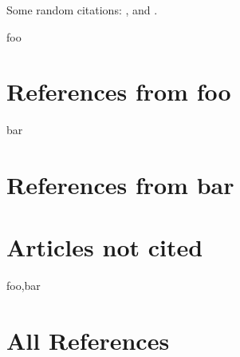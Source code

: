 \documentclass{article}
\begin{document}


Some random citations: \cite{Angle:2003},
\cite{Kilroy:1942} and \cite{Butron:1891}.

\begin{btSect}{foo}
 \section{References from foo}
 \btPrintCited
\end{btSect}

\begin{btSect}[plain]{bar}
 \section{References from bar}
 \btPrintCited
 \section{Articles not cited}
 \btPrintNotCited
\end{btSect}

\begin{btSect}[plain]{foo,bar}
 \section{All References}
 \btPrintAll
\end{btSect}
\end{document}
